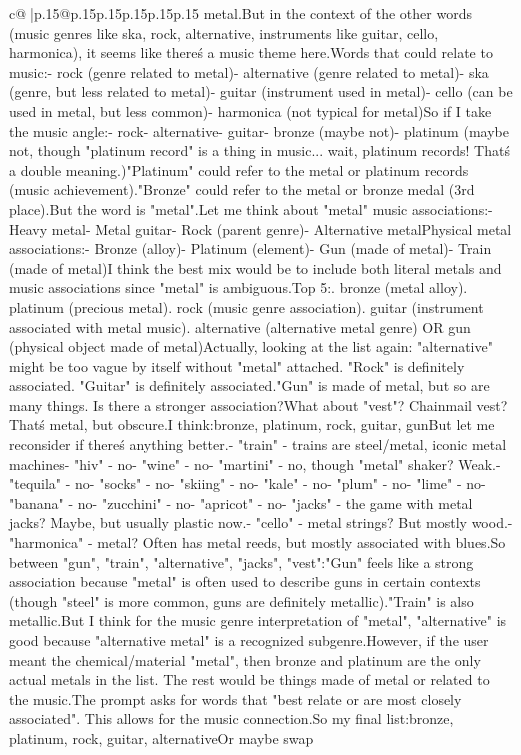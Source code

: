 \documentclass{article}
\begin{document}
{\begin{supertabular}{c@{$\;$}|p{.15\linewidth}@{}p{.15\linewidth}p{.15\linewidth}p{.15\linewidth}p{.15\linewidth}p{.15\linewidth}}
{{{metal.\n\n But in the context of the other words (music genres like ska, rock, alternative, instruments like guitar, cello, harmonica), it seems like there\'s a music theme here.\n\n Words that could relate to music:\n - rock (genre related to metal)\n - alternative (genre related to metal)\n - ska (genre, but less related to metal)\n - guitar (instrument used in metal)\n - cello (can be used in metal, but less common)\n - harmonica (not typical for metal)\n\n So if I take the music angle:\n - rock\n - alternative\n - guitar\n - bronze (maybe not)\n - platinum (maybe not, though "platinum record" is a thing in music... wait, platinum records! That\'s a double meaning.)\n\n "Platinum" could refer to the metal or platinum records (music achievement).\n "Bronze" could refer to the metal or bronze medal (3rd place).\n\n But the word is "metal".\n\n Let me think about "metal" music associations:\n - Heavy metal\n - Metal guitar\n - Rock (parent genre)\n - Alternative metal\n\n Physical metal associations:\n - Bronze (alloy)\n - Platinum (element)\n - Gun (made of metal)\n - Train (made of metal)\n\n I think the best mix would be to include both literal metals and music associations since "metal" is ambiguous.\n\n Top 5:. bronze (metal alloy). platinum (precious metal). rock (music genre association). guitar (instrument associated with metal music). alternative (alternative metal genre) OR gun (physical object made of metal)\n\n Actually, looking at the list again: "alternative" might be too vague by itself without "metal" attached. "Rock" is definitely associated. "Guitar" is definitely associated.\n\n "Gun" is made of metal, but so are many things. Is there a stronger association?\n\n What about "vest"? Chainmail vest? That\'s metal, but obscure.\n\n I think:\n bronze, platinum, rock, guitar, gun\n\n But let me reconsider if there\'s anything better.\n - "train" - trains are steel/metal, iconic metal machines\n - "hiv" - no\n - "wine" - no\n - "martini" - no, though "metal" shaker? Weak.\n - "tequila" - no\n - "socks" - no\n - "skiing" - no\n - "kale" - no\n - "plum" - no\n - "lime" - no\n - "banana" - no\n - "zucchini" - no\n - "apricot" - no\n - "jacks" - the game with metal jacks? Maybe, but usually plastic now.\n - "cello" - metal strings? But mostly wood.\n - "harmonica" - metal? Often has metal reeds, but mostly associated with blues.\n\n So between "gun", "train", "alternative", "jacks", "vest":\n\n "Gun" feels like a strong association because "metal" is often used to describe guns in certain contexts (though "steel" is more common, guns are definitely metallic).\n\n "Train" is also metallic.\n\n But I think for the music genre interpretation of "metal", "alternative" is good because "alternative metal" is a recognized subgenre.\n\n However, if the user meant the chemical/material "metal", then bronze and platinum are the only actual metals in the list. The rest would be things made of metal or related to the music.\n\n The prompt asks for words that "best relate or are most closely associated". This allows for the music connection.\n\n So my final list:\n bronze, platinum, rock, guitar, alternative\n\n Or maybe swap }}}
\end{supertabular}}
\end{document}

